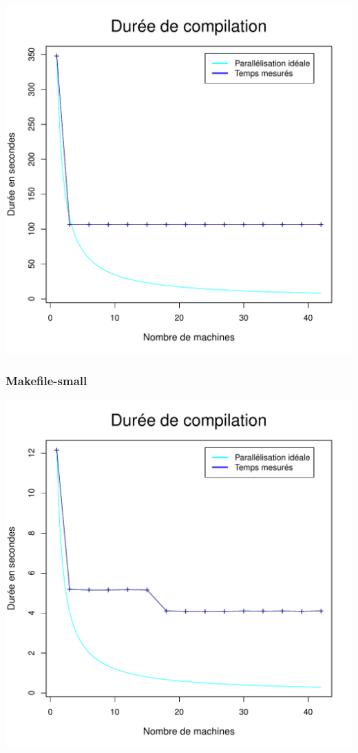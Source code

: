 \documentclass[a4paper, 11pt, titlepage]{article}
\begin{document}
\begin{center}
    \includegraphics[scale=0.55]{res/sujet_makefiles_premier_Makefile_nth8.pdf}
\end{center}


\subsubsection {Makefile-small}

\begin{center}
    \includegraphics[scale=0.55]{res/sujet_makefiles_premier_Makefile-small_nth8.pdf}
\end{center}
\end{document}
